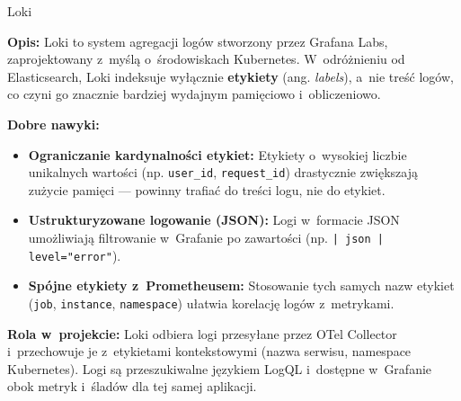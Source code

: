 \begin{techcard}{Loki}

\textbf{Opis:} Loki to system agregacji logów stworzony przez Grafana Labs, zaprojektowany z~myślą o~środowiskach Kubernetes. W~odróżnieniu od Elasticsearch, Loki indeksuje wyłącznie \textbf{etykiety} (ang. \textit{labels}), a~nie treść logów, co czyni go znacznie bardziej wydajnym pamięciowo i~obliczeniowo.

\textbf{Dobre nawyki:}
\begin{itemize}
  \item \textbf{Ograniczanie kardynalności etykiet:} Etykiety o~wysokiej liczbie unikalnych wartości (np. \texttt{user\_id}, \texttt{request\_id}) drastycznie zwiększają zużycie pamięci --- powinny trafiać do treści logu, nie do etykiet.
  \item \textbf{Ustrukturyzowane logowanie (JSON):} Logi w~formacie JSON umożliwiają filtrowanie w~Grafanie po zawartości (np. \texttt{| json | level="error"}).
  \item \textbf{Spójne etykiety z~Prometheusem:} Stosowanie tych samych nazw etykiet (\texttt{job}, \texttt{instance}, \texttt{namespace}) ułatwia korelację logów z~metrykami.
\end{itemize}

\textbf{Rola w~projekcie:} Loki odbiera logi przesyłane przez OTel Collector i~przechowuje je z~etykietami kontekstowymi (nazwa serwisu, namespace Kubernetes). Logi są przeszukiwalne językiem LogQL i~dostępne w~Grafanie obok metryk i~śladów dla tej samej aplikacji.

\end{techcard}

